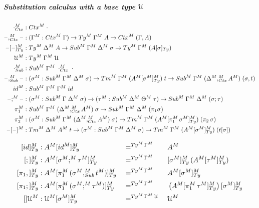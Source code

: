 \documentclass[a4paper,UKenglish,numberwithinsect,cleveref,thm-restate]{lipics-v2021}
\begin{document}
\subparagraph*{Substitution calculus with a base type $\mathcal{U}$}
\begin{alignat*}{10}
  \emptyctx_{\Ctx}^M     & : \Ctx^M\;\emptyctx \\
  \blank,_{\Ctx}^M\blank & : (\Gamma^M : \Ctx^M\;\Gamma) \to \Ty^M\;\Gamma^M\;A \to \Ctx^M\;(\Gamma, A) \\
  \blank[\blank]_{\Ty}^M & : \Ty^M\;\Delta^M\;A \to \Sub^M\;\Gamma^M\;\Delta^M\;\sigma \to \Ty^M\;\Gamma^M\;(\subTy{A}{\sigma}) \\
  \UU^M                  & : \Ty^M\;\Gamma^M\;\UU \\
  \emptysub_{\Sub}^M     & : \Sub^M\;\Gamma^M\;\emptyctx_{\Ctx}^M\;\cdot \\
  \blank,_{\Sub}^M\blank & : (\sigma^M : \Sub^M\;\Gamma^M\;\Delta^M\;\sigma) \to \Tm^M\;\Gamma^M\;(A^M [\sigma^M]^M_{\Ty})\;t \to \Sub^M\;\Gamma^M\;(\Delta^M ,^M_{\Ctx} A^M)\;(\sigma, t) \\
  \idS^M                 & : \Sub^M\;\Gamma^M\;\Gamma^M\;\idS \\
  \blank;^M\blank        & : (\sigma^M : \Sub^M\;\Gamma\;\Delta^M\;\sigma) \to (\tau^M : \Sub^M\;\Delta^M\;\Theta^M\;\tau) \to \Sub^M\;\Gamma^M\;\Delta^M\;(\sigma ; \tau) \\
  \pi_1^M                & : \Sub^M\;\Gamma^M\;(\Delta^M ,_{\Ctx}^M A^M)\;\sigma \to \Sub^M\;\Gamma^M\;\Delta^M\;(\pi_1\sigma) \\
  \pi_2^M                & : (\sigma^M : \Sub^M\;\Gamma^M\;(\Delta^M ,_{\Ctx}^M A^M)\;\sigma) \to \Tm^M\;\Gamma^M\;(A^M [ \pi_1^M\,\sigma^M ]^M_{\Ty})\;(\pi_2\,\sigma) \\
  \blank[\blank]^M       & : \Tm^M\;\Delta^M\;A^M\;t \to (\sigma^M : \Sub^M\;\Gamma^M\;\Delta^M\;\sigma) \to \Tm^M\;\Gamma^M\;(A^M [\sigma^M]_{\Ty}^M)\;(\sub{t}{\sigma} )
\end{alignat*}

\begin{alignat*}{5}
  [\idS]_{\Ty}^M      & : A^M [ \idS^M ]^M_{\Ty}                             &&  =^{\Ty^M\,\Gamma^M}\; && A^M \\
  [;]_{\Ty}^M         & : A^M [ \sigma^M ;^M \tau^M ]^M_{\Ty}                && =^{\Ty^M\,\Gamma^M}\; && [\sigma^M]^M_{\Ty}\,(A^M [\tau^M]^M_{\Ty}) \\
  [\pi_1,]^M_{\Ty}    & : A^M [ \pi_1^M\,(\sigma^M ,^M_{\Sub} t^M) ]^M_{\Ty} && =^{\Ty^M\,\Gamma^M} \; && A^M [\sigma^M]^M_{\Ty} \\
  [\pi_1;]^M_{\Ty}    & : A^M [ \pi_1^M\,(\sigma^M ;^M \tau^M) ]^M_{\Ty}     && =^{\Ty^M\,\Gamma^M} \; && \left(A^M [ \pi_1^M\,\tau^M]^M_{\Ty}\right) [\sigma^M]^M_{\Ty} \\
  []\UU^M             & : \UU^M [ \sigma^M ]^M_{\Ty}                           &&  =^{\Ty^M\,\Gamma^M\,\UU}      {} && \UU^M
\end{alignat*}
\end{document}
